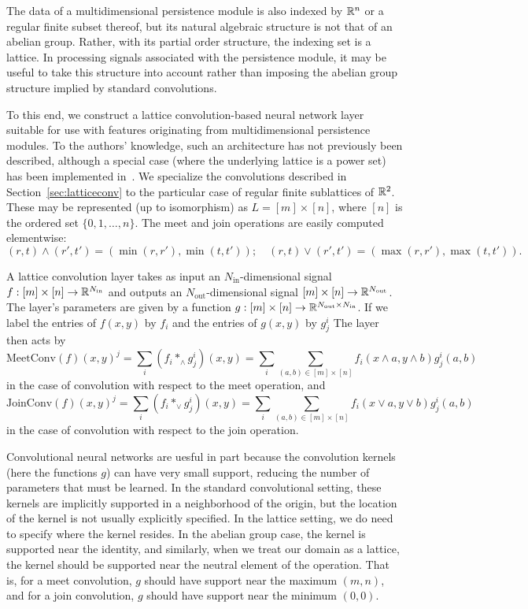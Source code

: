 \documentclass{article}
\begin{document}
The data of a multidimensional persistence module is also indexed by $\mathbb{R}^n$ or a
regular finite subset thereof, but its natural algebraic structure is not that
of an abelian group. Rather, with its partial order structure, the indexing set
is a lattice. In processing signals associated with the persistence module, it
may be useful to take this structure into account rather than imposing the
abelian group structure implied by standard convolutions.

To this end, we construct a lattice convolution-based neural network layer
suitable for use with features originating from multidimensional persistence
modules. To the authors' knowledge, such an architecture has not previously been
described, although a special case (where the underlying lattice is a power set)
has been implemented in~\cite{wendler_powerset_2019}. We specialize the convolutions described in
Section~\ref{sec:latticeconv} to the particular case of regular finite
sublattices of $\mathbb{R}^2$. These may be represented (up to isomorphism) as $L = [m]
\times [n]$, where $[n]$ is the ordered set $\{0,1,\dots,n\}$. The meet and join operations are easily computed
elementwise:
\[(r,t) \wedge (r',t') = (\min(r,r'),\min(t,t'));\quad (r,t)\vee (r',t') =
  (\max(r,r'),\max(t,t')).\]

A lattice convolution layer takes as input an $N_{\text{in}}$-dimensional signal
$f : [m] \times [n] \to \mathbb{R}^{N_{\text{in}}}$ and outputs an
$N_{\text{out}}$-dimensional signal $ [m] \times [n] \to
\mathbb{R}^{N_{\text{out}}}$. The layer's parameters are given by a function $g: [m]
\times [n] \to \mathbb{R}^{N_{\text{out}}\times N_{\text{in}}}$. If we label the
entries of $f(x,y)$ by $f_i$ and the entries of $g(x,y)$ by $g^i_j$ The layer then acts by
\[\text{MeetConv}(f)(x,y)^j = \sum_{i} (f_i \ast_{\wedge} g^i_j)(x,y) = \sum_i
  \sum_{(a,b) \in [m]\times [n]} f_i(x \wedge a, y \wedge b)g^i_j(a,b)\]
in the case of convolution with respect to the meet operation, and
\[\text{JoinConv}(f)(x,y)^j = \sum_{i} (f_i \ast_{\vee} g^i_j)(x,y) = \sum_i
  \sum_{(a,b) \in [m]\times [n]} f_i(x \vee a, y \vee b)g^i_j(a,b)\]
in the case of convolution with respect to the join operation.

Convolutional neural networks are uesful in part because the convolution kernels
(here the functions $g$) can have very small support, reducing the number of
parameters that must be learned. In the standard convolutional setting, these
kernels are implicitly supported in a neighborhood of the origin, but the
location of the kernel is not usually explicitly specified. In the lattice
setting, we do need to specify where the kernel resides. In the abelian group
case, the kernel is supported near the identity, and similarly, 
when we treat our domain as a lattice, the kernel should be supported
near the neutral element of the operation. That is, for a meet convolution, $g$
should have support near the maximum $(m,n)$, and for a join convolution, $g$
should have support near the minimum $(0,0)$.
\end{document}
